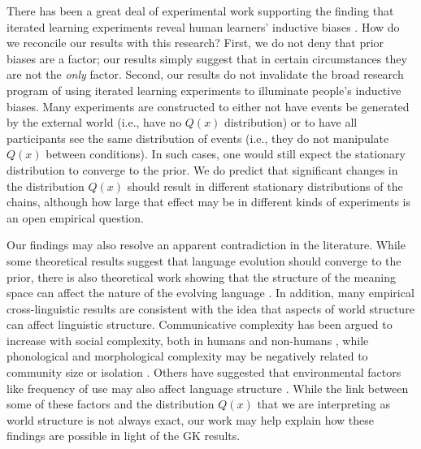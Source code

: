 \documentclass{apa}
\begin{document}
There has been a great deal of experimental work supporting the finding that iterated learning experiments reveal human learners' inductive biases \cite{kirbyetal08,realigriffiths09,kalishetal07,griffithsetal08,smithwonnacott10}. How do we reconcile our results with this research? First, we do not deny that prior biases are a factor; our results simply suggest that in certain circumstances they are not the {\it only} factor. Second, our results do not invalidate the broad research program of using iterated learning experiments to illuminate people's inductive biases. Many experiments are constructed to either not have events be generated by the external world (i.e., have no $Q(x)$ distribution)
or to have all participants see the same distribution of events (i.e., they do not manipulate $Q(x)$ between conditions).
In such cases, one would still expect the stationary distribution to converge to the prior.
We do predict that significant changes in the distribution $Q(x)$ should result in different stationary distributions of the chains, although how large that effect may be in different kinds of experiments is an open empirical question.

Our findings may also resolve an apparent contradiction in the literature. While some theoretical results suggest that language evolution should converge to the prior, there is also theoretical work showing that the structure of the meaning space can affect the nature of the evolving language \cite{kirby01,brightonkirby01,smithetal03,mauritsetal10}. In addition, many empirical cross-linguistic results are consistent with the idea that aspects of world structure can affect linguistic structure.
Communicative complexity has been argued to increase with social complexity, both in humans and non-humans \cite{mccombsemple05,freebergetal12}, while phonological and morphological complexity may be negatively related to community size or isolation \cite{trudgill09,lupyandale10}. Others have suggested that environmental factors like frequency of use may also affect language structure \cite{bybee00,evans03}. While the link between some of these factors and the distribution $Q(x)$ that we are interpreting as world structure is not always exact, our work may help explain how these findings are possible in light of the GK results.
\end{document}
